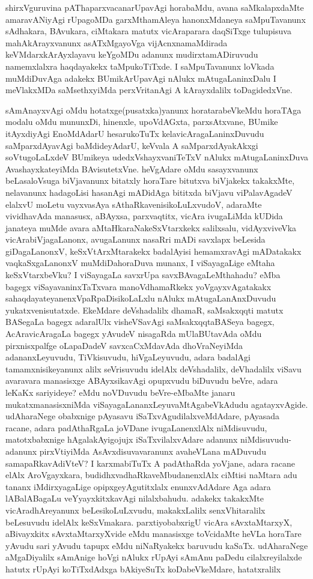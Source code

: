 shirxVguruvina pAThaparxvacanarUpavAgi horabaMdu, avana saMkalapxdaMte amara\-vANiyAgi \-rUpa\-goMDa garxMtha\-mAleya hanonxMdaneya saMpuTavanunx sAdha\-kara, BAvukara, ciMtakara matutx vicAraparara daqSiTxge tulupisuva mahAkArayxvanunx asATxMgayoVga vijAcnxnamaMdirada keVMdarxkArAyxlayavu keYgoMDu adanunx mudirxta\-mADi\-ruvudu namemxlalxra haqdayakekx taMpukoTiTxde. I saMpuTavanunx loVkada muMdiDu\-vAga adakekx BUmikArUpavAgi nAlukx mAtugaLaninxDalu I meVlakxMDa saMsethx\-yiMda perxVritanAgi A kArayxdalilx toDagidedxVne.

sAmAnayxvAgi oMdu hotatxge(pusatxka)yanunx horatara\-beVkeMdu horaTAga modalu oMdu  mununxDi, hinenxle, upoV\-dAGxta, parxsAtxvane, BUmike itAyxdiyAgi EnoMdAdarU hesarukoTuTx kela\-vicAra\-gaLaninxDu\-vudu saMparxdAyavAgi baMdide\-yAdarU, keVvala A saMparxdAyakAkxgi soVtu\-goLaLxdeV BUmikeya udedxVshayx\-vaniTeTxV nAlukx mAtugaLaninxDuva AvashayxkateyiMda BAvisutetxVne. heVgAdare oMdu sasayxvanunx beLasaloVsuga biVjavanunx bitatxly horaTare bitutxva biVjakekx takakxMte, nelavanunx hadagoLisi hasanAgi mADidAga bititxda biVjavu viPalavAgadeV elalxvU moLetu vayxvasAya sAthaRka\-venisi\-koLuLx\-vudoV, adaraMte vividhavAda \hbox{manasusx}, aBAyxsa, parxvaqtitx, vicAra ivugaLiMda kUDida janateya muMde avara aMtaHkaraNa\-keSxVtarxkekx salilxsalu, vidAyxviveVka vicArabiVjagaLanonx, avugaLanunx nasaRri mADi savxlapx beLe\-sida giDagaLanonxV, keSxVtArxMtarakekx badalAyisi hemamxravAgi mADatakakx vaqkaSxgaLanonxV muMdiDa\-hora\-Duva munanx, I viSayagaLige eMtaha keSxVtarxbeVku? I viSaya\-gaLa savxrUpa savxBAvagaLeMthahadu? eMba bagegx viSayavaninxTaTxvara manoVdhamaRkekx yoVgayxvAgatakakx sahaqdayateyanenxVpaRpaDisikoLaLxlu nAlukx mAtugaLa\-nAnxDu\-vudu yukatxvenisutatxde. EkeMdare deVshadalilx dhamaR, saMsakxqqti matutx BASegaLa bagegx ada\-ralUlx visheVSavAgi saMsakxqqtaBASeya bagegx, AcAravicAragaLa bagegx yAvudeV nisa\-gaRda mUla\-BUta\-vAda oMdu pirxnisxpalfge oLapaDadeV savxcaCxMdavAda dhoVraNe\-yiMda adananxLeyuvudu, TiVkisuvudu, hiVgaLeyuvudu, adara badalAgi tamamxni\-sikeyanunx alilx seVrisuvudu idelAlx deVshadalilx, deVhadalilx viSavu avaravara mana\-sisxge ABAyxsikavAgi opupxvudu biDuvudu beVre, adara leKaKx sariyideye? eMdu noVDuvudu beVre-eMbaMte janaru mukatxmanasisxniMda viSayagaLananxLeyu\break\-vaMtAgabeVkAdudu agatayx\-vAgide. udAharaNege obabxnige pAyasavu iSaTxvAgu\-dilalxveMdAdare, pAyasada racane, adara padAthaR\-gaLa  joVDane ivugaLanenxlAlx niMdisuvudu, matotxbabxnige hAgalakAyigojujx iSaTx\-vilalx\-vAdare \-adanunx niMdisu\-vudu- adanunx pirxVtiyiMda AsAvxdisuvavaranunx avaheVLana mADuvudu sama\-paRkavAdiVteV? I karxmabiTuTx A padAthaRda yoVjane, adara racane elAlx AroVgayx\-kara, budidhxvadhaRkaveMbudanenxlAlx ciMtisi naMtara adu tananx iMdirxyagaLige opipxge\-yAgutitxlalx enunxvAdAdare Aga adara lABa\-lABagaLu veYyayxkitxkavAgi nilalxbahudu. adakekx takakxMte vicAradhAreyanunx beLesikoLuLxvudu, makakxLalilx senxVhitaralilx beLesu\-vudu idelAlx keSxVmakara. parxtiyobabxrigU vicAra sAvxtaMtarxyX, aBivayxkitx sAvxtaMtarxyX\-vide eMdu mana\-sisxge toVcidaMte heVLa horaTare yAvudu sari yAvudu tapupx eMdu niNaRyakekx baruvudu kaSaTx. udAharaNege aMgaDiyalilx sAmAnige hoVgi nAlukx rUpAyi sAmAnu paDedu cilalxreyilalxde hatutx rUpAyi koTiTxdAdxga bAkiyeSuTx koDabeVkeMdare, hatatxralilx 